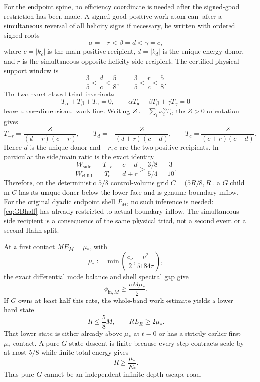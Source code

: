 \documentclass[11pt]{article}
\begin{document}
For the endpoint spine, no efficiency coordinate is needed after the signed-good restriction has been made.  A signed-good positive-work atom can, after a simultaneous reversal of all helicity signs if necessary, be written with ordered signed roots
\[
\alpha=-r<\beta=d<\gamma=c,
\]
where $c=|k_c|$ is the main positive recipient, $d=|k_d|$ is the unique energy donor, and $r$ is the simultaneous opposite-helicity side recipient.  The certified physical support window is
\begin{equation}\label{eq:58geom}
\boxed{
\frac35<\frac dc<\frac58,
\qquad
\frac35<\frac rc<\frac58.
}
\end{equation}
The two exact closed-triad invariants
\[
T_\alpha+T_\beta+T_\gamma=0,
\qquad
\alpha T_\alpha+\beta T_\beta+\gamma T_\gamma=0
\]
leave a one-dimensional work line.  Writing $Z:=\sum_i x_i^2T_i$, the $Z>0$ orientation gives
\begin{equation}\label{eq:triadRootWorks}
\boxed{
T_{-r}=\frac{Z}{(d+r)(c+r)},\qquad
T_d=-\frac{Z}{(d+r)(c-d)},\qquad
T_c=\frac{Z}{(c+r)(c-d)}.
}
\end{equation}
Hence $d$ is the unique donor and $-r,c$ are the two positive recipients.  In particular the side/main ratio is the exact identity
\begin{equation}\label{eq:sideRatioExact}
\frac{W_{\mathrm{side}}}{W_{\mathrm{child}}}
=\frac{T_{-r}}{T_c}
=\frac{c-d}{d+r}
>\frac{3/8}{5/4}=\frac3{10}.
\end{equation}
Therefore, on the deterministic $5/8$ control-volume grid $C=(5R/8,R]$, a $G$ child in $C$ has its unique donor below the lower face and is genuine boundary inflow.  For the original dyadic endpoint shell $P_M$, no such inference is needed: \eqref{eq:GBhalf} has already restricted to actual boundary inflow.  The simultaneous side recipient is a consequence of the same physical triad, not a second event or a second Hahn split.

At a first contact $ME_M=\mu_*$, with
\begin{equation}\label{eq:mustar}
\mu_*:=\min\left(\frac{c_\nu}{2},\frac{\nu^2}{5184\pi}\right),
\end{equation}
the exact differential mode balance and shell spectral gap give
\[
\phi_{\mathrm{in},M}\ge\frac{\nu M\mu_*}{2}.
\]
If $G$ owns at least half this rate, the whole-band work estimate yields a lower hard state
\begin{equation}\label{eq:Gfertility}
\boxed{
R\le\frac58M,
\qquad
R E_R\ge2\mu_*.
}
\end{equation}
That lower state is either already above $\mu_*$ at $t=0$ or has a strictly earlier first $\mu_*$ contact.  A pure-$G$ state descent is finite because every step contracts scale by at most $5/8$ while finite total energy gives
\[
R\ge\frac{\mu_*}{E_*}.
\]
Thus pure $G$ cannot be an independent infinite-depth escape road.
\end{document}
